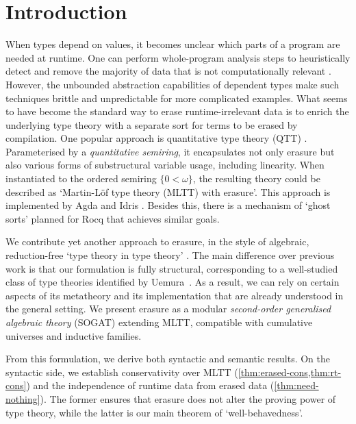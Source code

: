 \section{Introduction}\label{sec:intro}

When types depend on values, it becomes unclear which parts of a program are
needed at runtime. One can perform whole-program analysis steps to heuristically
detect and remove the majority of data that is not computationally relevant
\cite{Brady2004-ay,Tejiscak2020-rg}. However, the unbounded abstraction
capabilities of dependent types make such techniques brittle and unpredictable
for more complicated examples. What seems to have become the standard way to
erase runtime-irrelevant data is to enrich the underlying type theory with a
separate sort for terms to be erased by compilation. One popular approach
is quantitative type theory (QTT) \cite{McBride2016-oa,Atkey2018-pj}. Parameterised by a
\emph{quantitative semiring}, it encapsulates not only erasure but also
various forms of substructural variable usage, including linearity. When
instantiated to the ordered semiring $\{0 < \omega\}$, the resulting theory
could be described as `Martin-L\"of type theory (MLTT) with erasure'. This approach is
implemented by Agda \cite{agda-irrelevance} and Idris \cite{idris-quantities}.
Besides this, there is a mechanism of `ghost sorts' \cite{Winterhalter2024-pw}
planned for Rocq \cite{Winterhalter2025-tt} that achieves
similar goals.


We contribute yet another approach to erasure, in the style of algebraic,
reduction-free `type theory in type theory' \cite{Altenkirch2016-zc}. The main
difference over previous work is that our formulation is fully structural,
corresponding to a well-studied class of type theories identified by
Uemura~\cite{Uemura2021-jq}. As a result, we can rely on certain aspects of its
metatheory and its implementation that are already understood in the general
setting. We present erasure as a modular \emph{second-order generalised
algebraic theory} (SOGAT) extending MLTT, compatible with cumulative universes
and inductive families.

From this formulation, we derive both syntactic and semantic results. On the
syntactic side, we establish conservativity over MLTT
(\cref{thm:erased-cons,thm:rt-cons}) and the independence of runtime data from
erased data (\cref{thm:need-nothing}). The former ensures that erasure does not
alter the proving power of type theory, while the latter is our main theorem of
`well-behavedness'.

